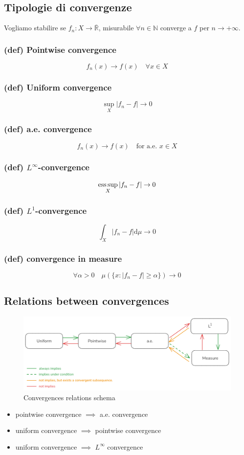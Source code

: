 \subsection{Tipologie di convergenze}
Vogliamo stabilire se $f_n:X\to \overline{\mathbb R}$, misurabile $\forall n\in \mathbb N$ converge a $f$ per $n\to +\infty$.
\subsubsection{(def) Pointwise convergence}
$$f_n(x)\to f(x)\quad \forall x\in X$$
\subsubsection{(def) Uniform convergence}
$$\sup_X |f_n-f|\to 0$$
\subsubsection{(def) a.e. convergence}
$$f_n(x)\to f(x) \quad \text{for a.e. }x\in X$$
\subsubsection{(def) $L^\infty$-convergence}
$$\operatorname*{ess\,sup}_X|f_n-f|\to 0$$
\subsubsection{(def) $L^1$-convergence}
$$\int_X|f_n-f|\mathrm d\mu\to 0$$
\subsubsection{(def) convergence in measure}
$$\forall \alpha>0\quad \mu(\{ x:|f_n-f|\geq \alpha\})\to 0$$
\subsection{Relations between convergences}
\begin{figure}[h]
    \centering
    \includegraphics[width=0.9\linewidth]{assets/convergences_image.png}
    \caption{Convergences relations schema}
    \label{fig:enter-label}
\end{figure}
\begin{itemize}
    \item pointwise convergence $\implies$ a.e. convergence
    \item uniform convergence $\implies$ pointwise convergence
    \item uniform convergence $\implies$ $L^\infty$ convergence
\end{itemize}
